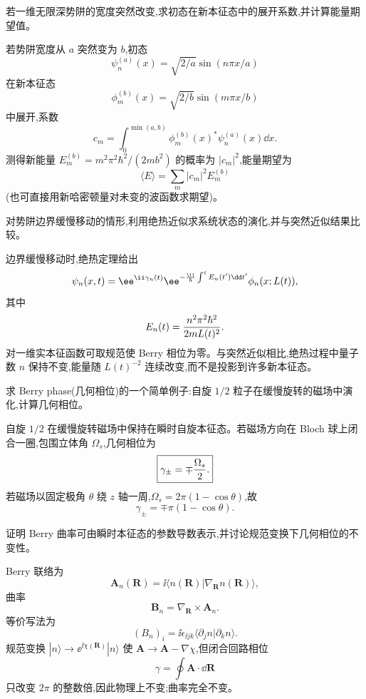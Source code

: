 \begin{question}
若一维无限深势阱的宽度突然改变,求初态在新本征态中的展开系数,并计算能量期望值。
\begin{solution}
若势阱宽度从 $a$ 突然变为 $b$,初态
\[
\psi_n^{(a)}(x)=\sqrt{2/a}\sin(n\pi x/a)
\]
在新本征态
\[
\phi_m^{(b)}(x)=\sqrt{2/b}\sin(m\pi x/b)
\]
中展开,系数
\[
c_m=\int_0^{\min(a,b)}\phi_m^{(b)}(x)^*\psi_n^{(a)}(x)\dd x.
\]
测得新能量 $E_m^{(b)}=m^2\pi^2\hbar^2/(2mb^2)$ 的概率为 $|c_m|^2$,能量期望为
\[
\langle E\rangle=\sum_m |c_m|^2E_m^{(b)}
\]
(也可直接用新哈密顿量对未变的波函数求期望)。
\end{solution}
\end{question}

\begin{question}
对势阱边界缓慢移动的情形,利用绝热近似求系统状态的演化,并与突然近似结果比较。
\begin{solution}
边界缓慢移动时,绝热定理给出
\[
\psi_n(x,t)=\ee^{\ii\gamma_n(t)}\ee^{-{\ii\over\hbar}\int^t E_n(t')\dd t'}\phi_n(x;L(t)),
\]
其中
\[
E_n(t)={n^2\pi^2\hbar^2\over2mL(t)^2}.
\]
对一维实本征函数可取规范使 Berry 相位为零。与突然近似相比,绝热过程中量子数 $n$ 保持不变,能量随 $L(t)^{-2}$ 连续改变,而不是投影到许多新本征态。
\end{solution}
\end{question}

\begin{question}
求 Berry phase(几何相位)的一个简单例子:自旋 $1/2$ 粒子在缓慢旋转的磁场中演化,计算几何相位。
\begin{solution}
自旋 $1/2$ 在缓慢旋转磁场中保持在瞬时自旋本征态。若磁场方向在 Bloch 球上闭合一圈,包围立体角 $\Omega_s$,几何相位为
\[
\boxed{\gamma_\pm=\mp{\Omega_s\over2}.}
\]
若磁场以固定极角 $\theta$ 绕 $z$ 轴一周,$\Omega_s=2\pi(1-
\cos\theta)$,故
\[
\gamma_\pm=\mp\pi(1-
\cos\theta).
\]
\end{solution}
\end{question}

\begin{question}
证明 Berry 曲率可由瞬时本征态的参数导数表示,并讨论规范变换下几何相位的不变性。
\begin{solution}
Berry 联络为
\[
\mathbf A_n(\mathbf R)=\ii\langle n(\mathbf R)|\nabla_\mathbf R n(\mathbf R)\rangle,
\]
曲率
\[
\mathbf B_n=\nabla_\mathbf R\times\mathbf A_n.
\]
等价写法为
\[
(B_n)_i=\ii\epsilon_{\ii jk}\langle\partial_j n|\partial_k n\rangle.
\]
规范变换 $|n\rangle\to \ee^{\ii\chi(\mathbf R)}|n\rangle$ 使 $\mathbf A\to\mathbf A-\nabla\chi$,但闭合回路相位
\[
\gamma=\oint\mathbf A\cdot\dd\mathbf R
\]
只改变 $2\pi$ 的整数倍,因此物理上不变;曲率完全不变。
\end{solution}
\end{question}

